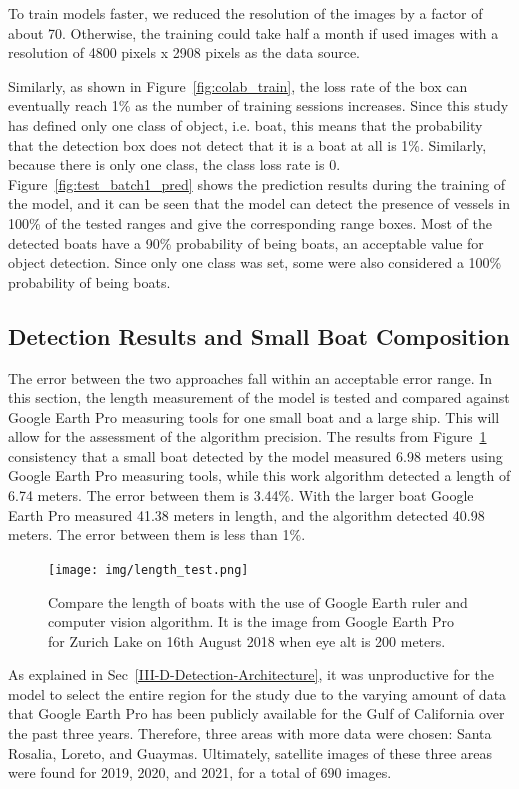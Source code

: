 To train models faster, we reduced the resolution of the images by a factor of about 70. Otherwise, the training could take half a month if used images with a resolution of 4800 pixels x 2908 pixels as the data source.

Similarly, as shown in Figure~\ref{fig:colab_train}, the loss rate of the box can eventually reach 1\% as the number of training sessions increases. Since this study has defined only one class of object, i.e. boat, this means that the probability that the detection box does not detect that it is a boat at all is 1\%. Similarly, because there is only one class, the class loss rate is 0. Figure~\ref{fig:test_batch1_pred} shows the prediction results during the training of the model, and it can be seen that the model can detect the presence of vessels in 100\% of the tested ranges and give the corresponding range boxes. Most of the detected boats have a 90\% probability of being boats, an acceptable value for object detection. Since only one class was set, some were also considered a 100\% probability of being boats.

\subsection{Detection Results and Small Boat Composition}
The error between the two approaches fall within an acceptable error range. In this section, the length measurement of the model is tested and compared against Google Earth Pro measuring tools for one small boat and a large ship. This will allow for the assessment of the algorithm precision. The results from Figure~\ref{fig:length_test} consistency that a small boat detected by the model measured 6.98 meters using Google Earth Pro measuring tools, while this work algorithm detected a length of 6.74 meters. The error between them is 3.44\%. With the larger boat Google Earth Pro measured 41.38 meters in length, and the algorithm detected 40.98 meters. The error between them is less than 1\%.

\begin{figure}[t]
    \center
    \texttt{[image: img/length\_test.png]}
    \caption{Compare the length of boats with the use of Google Earth ruler and computer vision algorithm. It is the image from Google Earth Pro for Zurich Lake on 16th August 2018 when eye alt is 200 meters.}
    \label{fig:length_test}
\end{figure}

As explained in Sec~\ref{III-D-Detection-Architecture}, it was unproductive for the model to select the entire region for the study due to the varying amount of data that Google Earth Pro has been publicly available for the Gulf of California over the past three years. Therefore, three areas with more data were chosen: Santa Rosalia, Loreto, and Guaymas. Ultimately, satellite images of these three areas were found for 2019, 2020, and 2021, for a total of 690 images.

